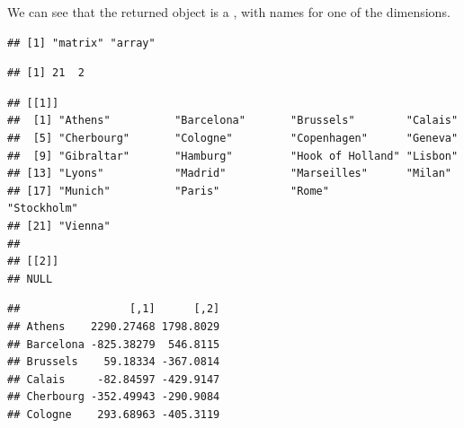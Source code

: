\documentclass[krantz2]{krantz}\usepackage{knitr}
\begin{document}
\begin{knitrout}\footnotesize
{}\color{fgcolor}\begin{kframe}
\begin{alltt}
 \hlkwb{<-} 
\end{alltt}
\end{kframe}
\end{knitrout}

We can see that the returned object  is a , with names for one of the dimensions.

\begin{knitrout}\footnotesize
{}\color{fgcolor}\begin{kframe}
\begin{alltt}
\end{alltt}
\begin{verbatim}
## [1] "matrix" "array"
\end{verbatim}
\begin{alltt}
\end{alltt}
\begin{verbatim}
## [1] 21  2
\end{verbatim}
\begin{alltt}
\end{alltt}
\begin{verbatim}
## [[1]]
##  [1] "Athens"          "Barcelona"       "Brussels"        "Calais"
##  [5] "Cherbourg"       "Cologne"         "Copenhagen"      "Geneva"
##  [9] "Gibraltar"       "Hamburg"         "Hook of Holland" "Lisbon"
## [13] "Lyons"           "Madrid"          "Marseilles"      "Milan"
## [17] "Munich"          "Paris"           "Rome"            "Stockholm"
## [21] "Vienna"
##
## [[2]]
## NULL
\end{verbatim}
\begin{alltt}
\end{alltt}
\begin{verbatim}
##                 [,1]      [,2]
## Athens    2290.27468 1798.8029
## Barcelona -825.38279  546.8115
## Brussels    59.18334 -367.0814
## Calais     -82.84597 -429.9147
## Cherbourg -352.49943 -290.9084
## Cologne    293.68963 -405.3119
\end{verbatim}
\end{kframe}
\end{knitrout}
\end{document}
